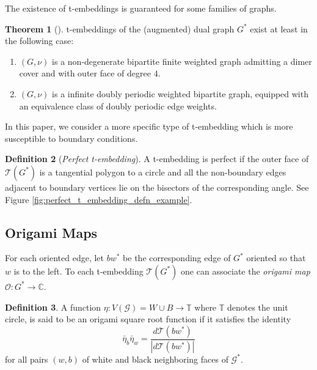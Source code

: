 \documentclass[12pt]{amsart}
\newcommand{\cT}{\mathcal T}
\newcommand{\cO}{\mathcal O}
\newcommand{\C}{{\mathbb C}}
\numberwithin{equation}{section}
\theoremstyle{definition}
\newtheorem{thm}{Theorem}[section]
\newtheorem{defn}[thm]{Definition}
\begin{document}
The existence of t-embeddings is guaranteed for some families of graphs.
\begin{thm}[\cite{circle_pattern}]
    \label{circle_pattern_t_embedding_existence}
    t-embeddings of the (augmented) dual graph $G^*$ exist at least in the following case: 
    \begin{enumerate}
        \item $(G, \nu)$ is a non-degenerate bipartite finite weighted graph admitting a dimer cover and with outer face of degree $4$.  
        \item  $(G, \nu)$ is a infinite doubly periodic weighted bipartite graph, equipped with an equivalence class of doubly periodic edge weights.
    \end{enumerate}
\end{thm}


In this paper, we consider a more specific type of t-embedding which is more susceptible to boundary conditions.
\begin{defn}[\emph{Perfect t-embedding}]
\label{defn: perfect_t_embedding}
	A t-embedding is perfect if the outer face of $\cT(G^*)$ is a tangential polygon to a circle and all the non-boundary edges adjacent to boundary vertices lie on the bisectors of the corresponding angle. See Figure \ref{fig:perfect_t_embedding_defn_example}.  
\end{defn}


\subsection{Origami Maps}
For each oriented edge, let $bw^*$ be the corresponding edge of $G^*$ oriented so that $w$ is to the left.  To each t-embedding $\cT(G^*)$ one can associate the \emph{origami map} $\cO: G^*\to \C$. 

\begin{defn}
    \label{defn:origami_sqrt}
     A function $\eta: V(\mathcal{G})=W \cup B \rightarrow \mathbb{T}$ where $\mathbb T$ denotes the unit circle, is said to be an origami square root function if it satisfies the identity
$$
\bar{\eta}_b \bar{\eta}_w=\frac{d \mathcal{T}\left(bw^*\right)}{\left|d \mathcal{T}\left(bw^*\right)\right|}
$$
for all pairs $(w,b)$ of white and black neighboring faces of $\mathcal{G}^*$. 
\end{defn}
\end{document}
